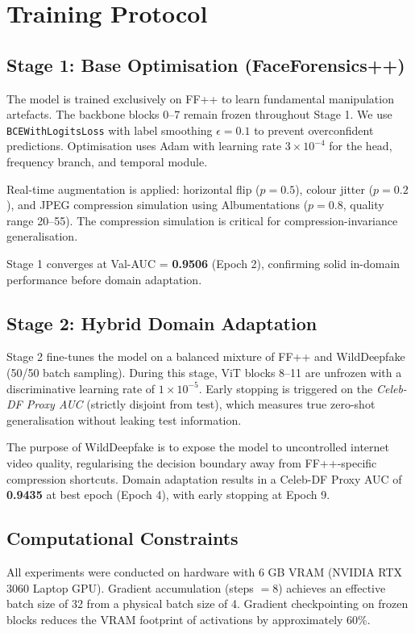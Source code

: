 \documentclass[journal]{IEEEtran}
\begin{document}
\section{Training Protocol}
\label{sec:training}

\subsection{Stage 1: Base Optimisation (FaceForensics++)}
The model is trained exclusively on FF++ to learn fundamental manipulation artefacts. The backbone blocks 0--7 remain frozen throughout Stage 1. We use \texttt{BCEWithLogitsLoss} with label smoothing $\epsilon = 0.1$ to prevent overconfident predictions. Optimisation uses Adam with learning rate $3 \times 10^{-4}$ for the head, frequency branch, and temporal module.

Real-time augmentation is applied: horizontal flip ($p=0.5$), colour jitter ($p=0.2$), and JPEG compression simulation using Albumentations ($p=0.8$, quality range 20--55). The compression simulation is critical for compression-invariance generalisation.

Stage 1 converges at Val-AUC = \textbf{0.9506} (Epoch 2), confirming solid in-domain performance before domain adaptation.

\subsection{Stage 2: Hybrid Domain Adaptation}
Stage 2 fine-tunes the model on a balanced mixture of FF++ and WildDeepfake (50/50 batch sampling). During this stage, ViT blocks 8--11 are unfrozen with a discriminative learning rate of $1 \times 10^{-5}$. Early stopping is triggered on the \textit{Celeb-DF Proxy AUC} (strictly disjoint from test), which measures true zero-shot generalisation without leaking test information.

The purpose of WildDeepfake is to expose the model to uncontrolled internet video quality, regularising the decision boundary away from FF++-specific compression shortcuts. Domain adaptation results in a Celeb-DF Proxy AUC of \textbf{0.9435} at best epoch (Epoch 4), with early stopping at Epoch 9.

\subsection{Computational Constraints}
All experiments were conducted on hardware with 6 GB VRAM (NVIDIA RTX 3060 Laptop GPU). Gradient accumulation (steps $= 8$) achieves an effective batch size of 32 from a physical batch size of 4. Gradient checkpointing on frozen blocks reduces the VRAM footprint of activations by approximately 60\%.
\end{document}
